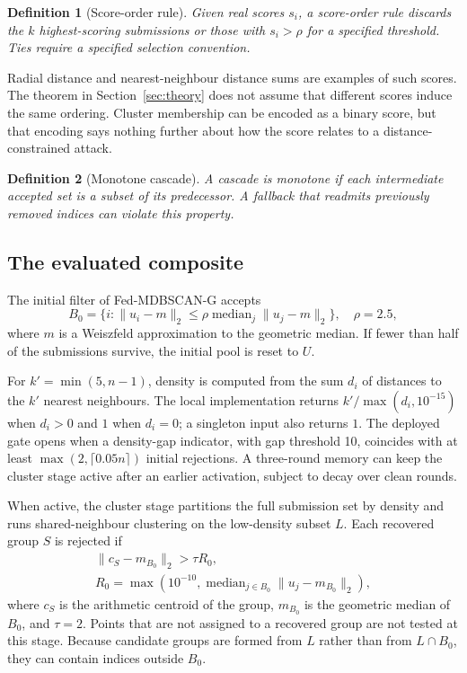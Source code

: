 \documentclass[journal]{IEEEtran}
\newtheorem{definition}{Definition}
\newcommand{\method}{Fed-MDBSCAN-G}
\begin{document}
\begin{definition}[Score-order rule]\label{def:dispersion}
Given real scores $s_i$, a score-order rule discards the $k$ highest-scoring submissions or those with $s_i>\rho$ for a specified threshold. Ties require a specified selection convention.
\end{definition}
Radial distance and nearest-neighbour distance sums are examples of such scores. The theorem in Section~\ref{sec:theory} does not assume that different scores induce the same ordering. Cluster membership can be encoded as a binary score, but that encoding says nothing further about how the score relates to a distance-constrained attack.

\begin{definition}[Monotone cascade]\label{def:cascade}
A cascade is monotone if each intermediate accepted set is a subset of its predecessor. A fallback that readmits previously removed indices can violate this property.
\end{definition}

\subsection{The evaluated composite}
The initial filter of \method{} accepts
\begin{equation}
B_0=\{i:\|u_i-m\|_2\leq\rho\operatorname{median}_j\|u_j-m\|_2\},\quad\rho=2.5,
\label{eq:l0}
\end{equation}
where $m$ is a Weiszfeld approximation to the geometric median. If fewer than half of the submissions survive, the initial pool is reset to $U$.

For $k'=\min(5,n-1)$, density is computed from the sum $d_i$ of distances to the $k'$ nearest neighbours. The local implementation returns $k'/\max(d_i,10^{-15})$ when $d_i>0$ and $1$ when $d_i=0$; a singleton input also returns $1$. The deployed gate opens when a density-gap indicator, with gap threshold 10, coincides with at least $\max(2,\lceil0.05n\rceil)$ initial rejections. A three-round memory can keep the cluster stage active after an earlier activation, subject to decay over clean rounds.

When active, the cluster stage partitions the full submission set by density and runs shared-neighbour clustering on the low-density subset $L$. Each recovered group $S$ is rejected if
\begin{equation}
\begin{gathered}
\|c_S-m_{B_0}\|_2>\tau R_0,\\
R_0=\max\!\left(10^{-10},\operatorname{median}_{j\in B_0}\|u_j-m_{B_0}\|_2\right),
\end{gathered}
\label{eq:consensus}
\end{equation}
where $c_S$ is the arithmetic centroid of the group, $m_{B_0}$ is the geometric median of $B_0$, and $\tau=2$. Points that are not assigned to a recovered group are not tested at this stage. Because candidate groups are formed from $L$ rather than from $L\cap B_0$, they can contain indices outside $B_0$.
\end{document}
